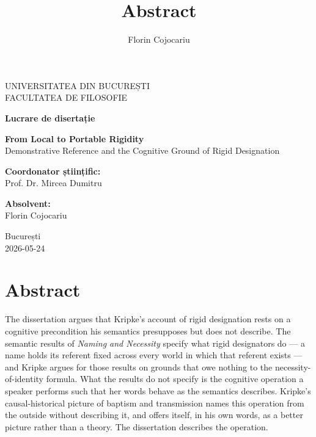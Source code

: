\documentclass[11pt]{article}
\title{Abstract%
}
\author{Florin Cojocariu}
\date{}
\begin{document}
\begin{center}
\vspace*{0.5cm}
{\large UNIVERSITATEA DIN BUCUREȘTI}\\[0.3em]
{\large FACULTATEA DE FILOSOFIE}

\vfill

{\large\bfseries Lucrare de disertație}

\vspace{2em}

{\LARGE\bfseries From Local to Portable Rigidity}\\[1em]
{\Large Demonstrative Reference and the Cognitive Ground of Rigid Designation}

\vfill
\end{center}
\noindent
\begin{minipage}[t]{0.45\textwidth}
\raggedright
\textbf{Coordonator științific:}\\
Prof. Dr. Mircea Dumitru
\end{minipage}%
\hfill
\begin{minipage}[t]{0.45\textwidth}
\raggedleft
\textbf{Absolvent:}\\
Florin Cojocariu
\end{minipage}
\vspace{1.5cm}
\begin{center}
{\large București}\\[0.3em]
{\large 2026-05-24}
\end{center}
\clearpage
\section*{Abstract}\label{abstract}

The dissertation argues that Kripke's account of rigid designation rests on a cognitive precondition his semantics presupposes but does not describe. The semantic results of \emph{Naming and Necessity} specify what rigid designators do --- a name holds its referent fixed across every world in which that referent exists --- and Kripke argues for those results on grounds that owe nothing to the necessity-of-identity formula. What the results do not specify is the cognitive operation a speaker performs such that her words behave as the semantics describes. Kripke's causal-historical picture of baptism and transmission names this operation from the outside without describing it, and offers itself, in his own words, as a better picture rather than a theory. The dissertation describes the operation.
\end{document}
